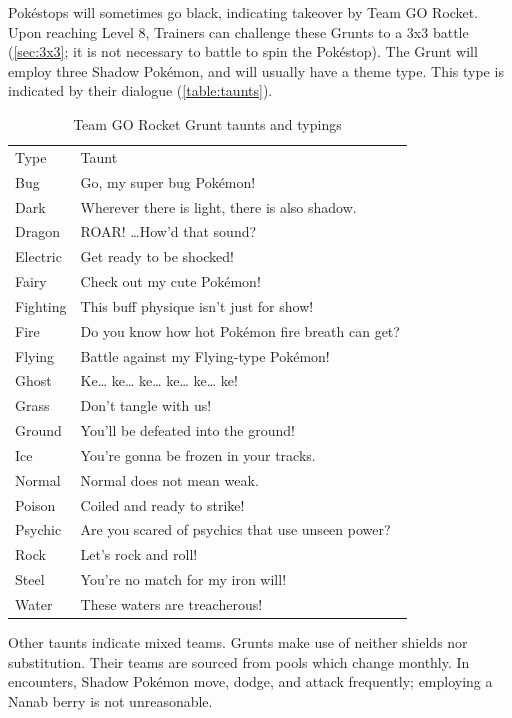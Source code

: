 Pokéstops will sometimes go black, indicating takeover by Team GO Rocket.
Upon reaching Level 8, Trainers can challenge these Grunts to a 3x3 battle (\autoref{sec:3x3};
 it is not necessary to battle to spin the Pokéstop).
The Grunt will employ three Shadow Pokémon, and will usually have a theme type.
This type is indicated by their dialogue (\autoref{table:taunts}).
\begin{table}
\footnotesize
\centering
\begin{tabular}{ll}
Type & Taunt\\
\Midrule
  Bug & Go, my super bug Pokémon!\\
  Dark & Wherever there is light, there is also shadow.\\
  Dragon & ROAR! …How'd that sound?\\
  Electric & Get ready to be shocked!\\
  Fairy & Check out my cute Pokémon!\\
  Fighting & This buff physique isn't just for show!\\
  Fire & Do you know how hot Pokémon fire breath can get?\\
  Flying & Battle against my Flying-type Pokémon!\\
  Ghost & Ke… ke… ke… ke… ke… ke!\\
  Grass & Don't tangle with us!\\
  Ground & You'll be defeated into the ground!\\
  Ice & You're gonna be frozen in your tracks.\\
  Normal & Normal does not mean weak.\\
  Poison & Coiled and ready to strike!\\
  Psychic & Are you scared of psychics that use unseen power?\\
  Rock & Let's rock and roll!\\
  Steel & You're no match for my iron will!\\
  Water & These waters are treacherous!\\
\end{tabular}
\caption{Team GO Rocket Grunt taunts and typings\label{table:taunts}}
\end{table}
Other taunts indicate mixed teams.
Grunts make use of neither shields nor substitution.
Their teams are sourced from pools which change monthly.
In encounters, Shadow Pokémon move, dodge, and attack frequently; employing a Nanab berry is not unreasonable.

